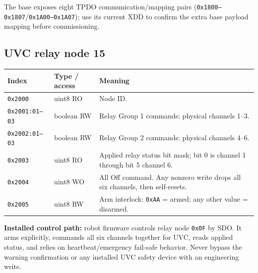\documentclass[
  10pt,
  letterpaper,
  openany]{report}
\newcounter{none} %
\begin{document}
The base exposes eight TPDO communication/mapping pairs
(\texttt{0x1800–0x1807}/\texttt{0x1A00–0x1A07}); use its current XDD to
confirm the extra base payload mapping before commissioning.

\subsection{UVC relay node 15}\label{uvc-relay-node-15}

{\def\LTcaptype{none} %
\begin{longtable}[]{@{}
  >{\raggedright\arraybackslash}p{}
  >{\raggedright\arraybackslash}p{}
  >{\raggedright\arraybackslash}p{}@{}}
\toprule\noalign{}
\begin{minipage}[b]{\linewidth}\raggedright
Index
\end{minipage} & \begin{minipage}[b]{\linewidth}\raggedright
Type / access
\end{minipage} & \begin{minipage}[b]{\linewidth}\raggedright
Meaning
\end{minipage} \\
\midrule\noalign{}
\endhead
\bottomrule\noalign{}
\endlastfoot
\texttt{0x2000} & uint8 RO & Node ID. \\
\texttt{0x2001:01–03} & boolean RW & Relay Group 1 commands: physical
channels 1--3. \\
\texttt{0x2002:01–03} & boolean RW & Relay Group 2 commands: physical
channels 4--6. \\
\texttt{0x2003} & uint8 RO & Applied relay status bit mask; bit 0 is
channel 1 through bit 5 channel 6. \\
\texttt{0x2004} & uint8 WO & All Off command. Any nonzero write drops
all six channels, then self-resets. \\
\texttt{0x2005} & uint8 RW & Arm interlock: \texttt{0xAA} = armed; any
other value = disarmed. \\
\end{longtable}
}

\begin{manualwarning}

\textbf{Installed control path:} robot firmware controls relay node
\texttt{0x0F} by SDO. It arms explicitly, commands all six channels
together for UVC, reads applied status, and relies on
heartbeat/emergency fail-safe behavior. Never bypass the warning
confirmation or any installed UVC safety device with an engineering
write.

\end{manualwarning}
\end{document}
